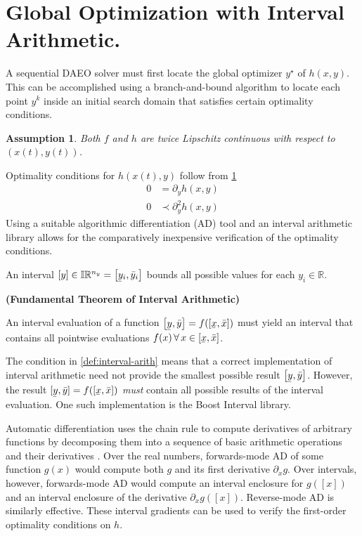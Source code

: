 \documentclass[twoside,leqno, twocolumn]{article}
\newcommand{\bbR}{\ensuremath{\mathbb{R}}}
\newcommand{\bbI}{\ensuremath{\mathbb{I}}}
\newcommand\ubar[1]{\underaccent{\bar}{#1}}
\newtheorem{assumption}{Assumption}[section]
\begin{document}
\section{Global Optimization with Interval Arithmetic.}
A sequential DAEO solver must first locate the global optimizer $y^\star$ of $h(x, y)$. This can be accomplished using a branch-and-bound algorithm to locate each point $y^k$ inside an initial search domain that satisfies certain optimality conditions.

\begin{assumption} 
	\label{assume:twice-lipschitz}
	Both $f$ and $h$ are twice Lipschitz continuous with respect to $(x(t), y(t))$.
\end{assumption}
Optimality conditions for $h(x(t), y)$ follow from \ref{assume:twice-lipschitz}
\begin{equation}
	\label{eq:optimality-conditions}
	\begin{aligned}
		0 &= \partial_yh(x, y)\\
		0 &\prec\partial^2_{y}h(x, y)
	\end{aligned}
\end{equation}
Using a suitable algorithmic differentiation (AD) tool and an interval arithmetic library allows for the comparatively inexpensive verification of the optimality conditions\cite{rallGlobalOptimizationUsing1985}. 

An interval $[y] \in \bbI\bbR^{n_y} = \left[\ubar y_i, \bar y_i\right]$ bounds all possible values for each $y_i\in\bbR$. 
\begin{Definition}
	\label{def:interval-arith}
	\textbf{(Fundamental Theorem of Interval Arithmetic)}
	
	An interval evaluation of a function $\left[\ubar{y},\bar{y}\right] = f(\left[\ubar x, \bar x\right])$ must yield an interval that contains all pointwise evaluations $f(x)\,\forall\,x\in\left[\ubar x, \bar x\right]$.
\end{Definition}
The condition in \ref{def:interval-arith} means that a correct implementation of interval arithmetic need not provide the smallest possible result $\left[\ubar y, \bar y\right]$\cite{hickeyIntervalArithmeticPrinciples2001}. However, the result $[\ubar y, \bar y] = f(\left[\ubar x, \bar x\right])$ \textit{must} contain all possible results of the interval evaluation. One such implementation is the Boost Interval library\cite{melquiondBoostIntervalLibrary2022}.

Automatic differentiation uses the chain rule to compute derivatives of arbitrary functions by decomposing them into a sequence of basic arithmetic operations and their derivatives \cite{griewankEvaluatingDerivativesPrinciples2008}. Over the real numbers, forwards-mode AD of some function $g(x)$ would compute both $g$ and its first derivative $\partial_x g$. Over intervals, however, forwards-mode AD would compute an interval enclosure for $g(\left[x\right])$ and an interval enclosure of the derivative $\partial_xg(\left[x\right])$\cite{rallGlobalOptimizationUsing1985}. Reverse-mode AD is similarly effective. These interval gradients can be used to verify the first-order optimality conditions on $h$.
\end{document}
